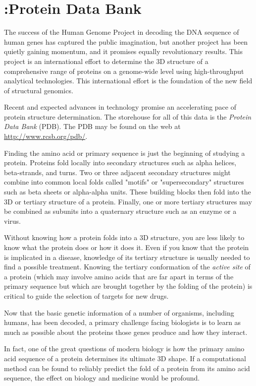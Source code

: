 \chapter{:Protein Data Bank}
\label{chap:chapter11}
\minitoc

The success of the Human Genome Project in decoding the DNA sequence of human genes has captured the public imagination, but another project has been quietly gaining momentum, and it promises equally revolutionary results. This project is an international effort to determine the 3D structure of a comprehensive range of proteins on a genome-wide level using high-throughput analytical technologies. This international effort is the foundation of the new field of structural genomics.

Recent and expected advances in technology promise an accelerating pace of protein structure determination. The storehouse for all of this data is the \textit{Protein Data Bank} (PDB). The PDB may be found on the web at \href{http://www.rcsb.org/pdb/}{http://www.rcsb.org/pdb/}.

Finding the amino acid or primary sequence is just the beginning of studying a protein. Proteins fold locally into secondary structures such as alpha helices, beta-strands, and turns. Two or three adjacent secondary structures might combine into common local folds called "motifs" or "supersecondary" structures such as beta sheets or alpha-alpha units. These building blocks then fold into the 3D or tertiary structure of a protein. Finally, one or more tertiary structures may be combined as subunits into a quaternary structure such as an enzyme or a virus.

Without knowing how a protein folds into a 3D structure, you are less likely to know what the protein does or how it does it. Even if you know that the protein is implicated in a disease, knowledge of its tertiary structure is usually needed to find a possible treatment. Knowing the tertiary conformation of the \textit{active site} of a protein (which may involve amino acids that are far apart in terms of the primary sequence but which are brought together by the folding of the protein) is critical to guide the selection of targets for new drugs.

Now that the basic genetic information of a number of organisms, including humans, has been decoded, a primary challenge facing biologists is to learn as much as possible about the proteins those genes produce and how they interact.

In fact, one of the great questions of modern biology is how the primary amino acid sequence of a protein determines its ultimate 3D shape. If a computational method can be found to reliably predict the fold of a protein from its amino acid sequence, the effect on biology and medicine would be profound.


